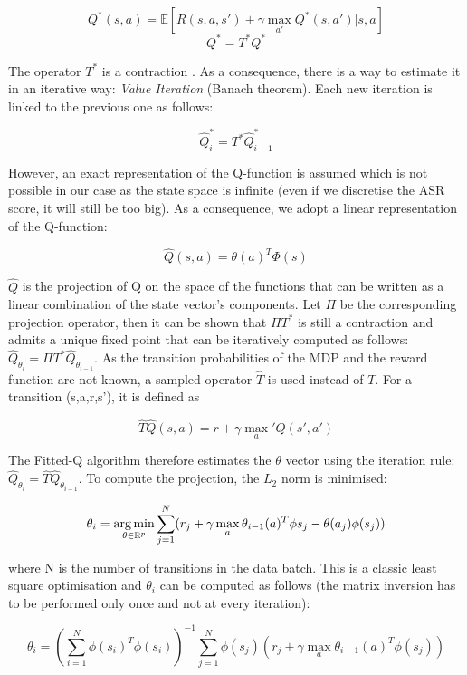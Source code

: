         	$$ Q^*(s,a) = \mathbb{E}[R(s,a,s') + \gamma \max_{a'} Q^*(s,a') | s, a]$$
            $$ Q^* = T^* Q^*$$
            
       	The operator $T^*$ is a contraction \cite{Bellman1957}. As a consequence, there is a way to estimate it in an iterative way: \textit{Value Iteration} (Banach theorem). Each new iteration is linked to the previous one as follows:
        
        	$$ \hat{Q}^*_i = T^* \hat{Q}^*_{i-1}$$
            
       	However, an exact representation of the Q-function is assumed which is not possible in our case as the state space is infinite (even if we discretise the ASR score, it will still be too big). As a consequence, we adopt a linear representation of the Q-function:
        
        	$$ \hat{Q}(s,a) = \theta(a)^T \Phi(s) $$
            
      	$\hat{Q}$ is the projection of Q on the space of the functions that can be written as a linear combination of the state vector's components. Let $\Pi$ be the corresponding projection operator, then it can be shown that $\Pi T^*$ is still a contraction and admits a unique fixed point that can be iteratively computed as follows: $\hat{Q}_{\theta_i} = \Pi T^* \hat{Q}_{\theta_{i-1}}$. As the transition probabilities of the MDP and the reward function are not known, a sampled operator $\hat{T}$ is used instead of $T$. For a transition (s,a,r,s'), it is defined as
        
        	$$ \hat{T} \hat{Q}(s,a) = r + \gamma \max_a' Q(s',a') $$
            
      	The Fitted-Q algorithm therefore estimates the $\theta$ vector using the iteration rule: $\hat{Q}_{\theta_i} = \hat{T} \hat{Q}_{\theta_{i-1}}$. To compute the projection, the $L_2$ norm is minimised:
        
        	$$ \theta_i = \operatorname*{arg\,min}_{\theta \in \mathbb{R}^p} \sum_{j=1}^N (r_j + \gamma \max_a \theta_{i-1}(a)^T \phi{s_j} - \theta (a_j) \phi(s_j)) $$
            
      	where N is the number of transitions in the data batch. This is a classic least square optimisation and $\theta_i$ can be computed as follows (the matrix inversion has to be performed only once and not at every iteration):
        
        	$$ \theta_i = (\sum_{i=1}^N \phi(s_i)^T \phi(s_i))^{-1} \sum_{j=1}^N \phi(s_j) (r_j + \gamma \max_a \theta_{i-1}(a)^T \phi(s_j)) $$
            

